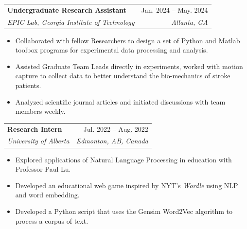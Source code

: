 \documentclass[letterpaper,11pt]{article}
\makeatletter
\newcommand{\resumeItem}[1]{
  \item\small{
    {#1 \vspace{-2pt}}
  }
}
\newcommand{\resumeSubheading}[4]{
  \vspace{-2pt}\item
    \begin{tabular*}{0.97\textwidth}[t]{l@{\extracolsep{\fill}}r}
      \textbf{\small#1} & \small #2 \\
      \textit{\small#3} & \textit{\small #4} \\
    \end{tabular*}\vspace{-5pt}
}
\newcommand{\resumeSubSubheading}[2]{
    \item
    \begin{tabular*}{0.97\textwidth}{l@{\extracolsep{\fill}}r}
      \textit{\small#1} & \textit{\small #2} \\
    \end{tabular*}\vspace{-5pt}
}
\newcommand{\resumeSubHeadingListEnd}{\end{itemize}}
\newcommand{\resumeItemListStart}{\begin{itemize}}
\newcommand{\resumeItemListEnd}{\end{itemize}\vspace{-5pt}}
\makeatother
\begin{document}

    \resumeSubheading
      {Undergraduate Research Assistant}{Jan. 2024 -- May. 2024}
      {EPIC Lab, Georgia Institute of Technology}{Atlanta, GA}
      \resumeItemListStart
        \resumeItem{Collaborated with fellow Researchers to design a set of Python and Matlab toolbox programs for experimental data processing and analysis.}
        \resumeItem{Assisted Graduate Team Leads directly in experiments, worked with motion capture to collect data to better understand the bio-mechanics of stroke patients.}
        \resumeItem{Analyzed scientific journal articles and initiated discussions with team members weekly.}
    \resumeItemListEnd

    \resumeSubheading
      {Research Intern}{Jul. 2022 -- Aug. 2022}
      {University of Alberta}{Edmonton, AB, Canada}
      \resumeItemListStart
        \resumeItem{Explored applications of Natural Language Processing in education with Professor Paul Lu.}
        \resumeItem{Developed an educational web game inspired by NYT's \emph{Wordle} using NLP and word embedding.}
        \resumeItem{Developed a Python script that uses the Gensim Word2Vec algorithm to process a corpus of text.}
      \resumeItemListEnd
\end{document}

